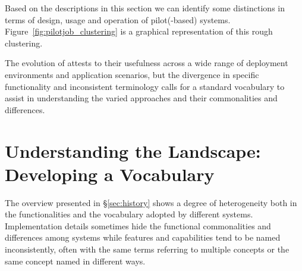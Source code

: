 \documentclass{sig-alternate}
\begin{document}

Based on the descriptions in this section we can identify some distinctions in
terms of design, usage and operation of pilot(-based) systems.
Figure~\ref{fig:pilotjob_clustering} is a graphical representation of this
rough clustering.

The evolution of \pilotjobs attests to their usefulness across a wide range of
deployment environments and application scenarios, but the divergence in
specific functionality and inconsistent terminology calls for a standard
vocabulary to assist in understanding the varied approaches and their
commonalities and differences.





\section{Understanding the Landscape: Developing a Vocabulary}
\label{sec:understanding}

The overview presented in \S\ref{sec:history} shows a degree of
heterogeneity both in the functionalities and the vocabulary adopted by
different \pilot systems. Implementation details sometimes hide the
functional commonalities and differences among \pilot systems while
features and capabilities tend to be named inconsistently, often with
the same terms referring to multiple concepts or the same concept named
in different ways.
\end{document}
